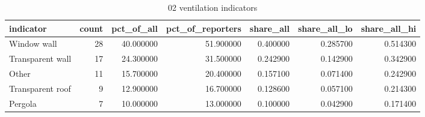 \begin{table}
\caption{02 ventilation indicators}
\label{tab:02_ventilation_indicators}
\begin{tabular}{lrrrrrr}
\toprule
indicator & count & pct\_of\_all & pct\_of\_reporters & share\_all & share\_all\_lo & share\_all\_hi \\
\midrule
Window wall & 28 & 40.000000 & 51.900000 & 0.400000 & 0.285700 & 0.514300 \\
Transparent wall & 17 & 24.300000 & 31.500000 & 0.242900 & 0.142900 & 0.342900 \\
Other & 11 & 15.700000 & 20.400000 & 0.157100 & 0.071400 & 0.242900 \\
Transparent roof & 9 & 12.900000 & 16.700000 & 0.128600 & 0.057100 & 0.214300 \\
Pergola & 7 & 10.000000 & 13.000000 & 0.100000 & 0.042900 & 0.171400 \\
\bottomrule
\end{tabular}
\end{table}
